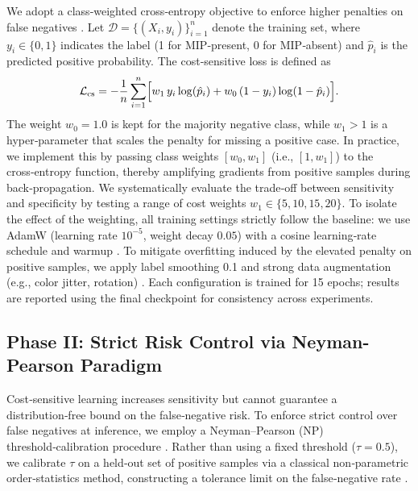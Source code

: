 \documentclass[sigconf,review,anonymous]{acmart}
\theoremstyle{remark}
\begin{document}
We adopt a class‑weighted cross‑entropy objective to enforce higher penalties on false negatives \cite{he2009learning}.  
Let \(\mathcal{D} = \{(X_i, y_i)\}_{i=1}^{n}\) denote the training set, where \(y_i \in \{0,1\}\) indicates the label (1 for MIP‑present, 0 for MIP‑absent) and \(\hat{p}_i\) is the predicted positive probability. The cost‑sensitive loss is defined as  
\begin{equation*}
    \mathcal{L}_{\mathrm{cs}} = - \frac{1}{n} \sum_{i=1}^{n} \Bigl[ w_{1} \, y_i \log(\hat{p}_i) + w_{0} \, (1-y_i) \log(1-\hat{p}_i) \Bigr].
\end{equation*}
The weight \(w_{0}=1.0\) is kept for the majority negative class, while \(w_{1} > 1\) is a hyper‑parameter that scales the penalty for missing a positive case.  
In practice, we implement this by passing class weights \([w_{0}, w_{1}]\) (i.e., \([1, w_{1}]\)) to the cross‑entropy function, thereby amplifying gradients from positive samples during back‑propagation.
We systematically evaluate the trade‑off between sensitivity and specificity by testing a range of cost weights \(w_{1} \in \{5, 10, 15, 20\}\).  To isolate the effect of the weighting, all training settings strictly follow the baseline: we use AdamW \cite{loshchilov2017decoupled} (learning rate \(10^{-5}\), weight decay \(0.05\)) with a cosine learning‑rate schedule and warmup \cite{loshchilov2016sgdr}. To mitigate overfitting induced by the elevated penalty on positive samples, we apply label smoothing 0.1 \cite{szegedy2016rethinking} and strong data augmentation (e.g., color jitter, rotation) \cite{buslaev2020albumentations}. Each configuration is trained for 15 epochs; results are reported using the final checkpoint for consistency across experiments.

\subsection{Phase II: Strict Risk Control via Neyman-Pearson Paradigm}
\label{sec:phase2_method}

Cost‑sensitive learning increases sensitivity but cannot guarantee a distribution‑free bound on the false‑negative risk. To enforce strict control over false negatives at inference, we employ a Neyman–Pearson (NP) threshold‑calibration procedure \cite{rigollet2011neyman,tong2018neyman}. Rather than using a fixed threshold (\(\tau = 0.5\)), we calibrate \(\tau\) on a held‑out set of positive samples via a classical non‑parametric order‑statistics method, constructing a tolerance limit on the false‑negative rate \cite{wilks1941determination}.
\end{document}
